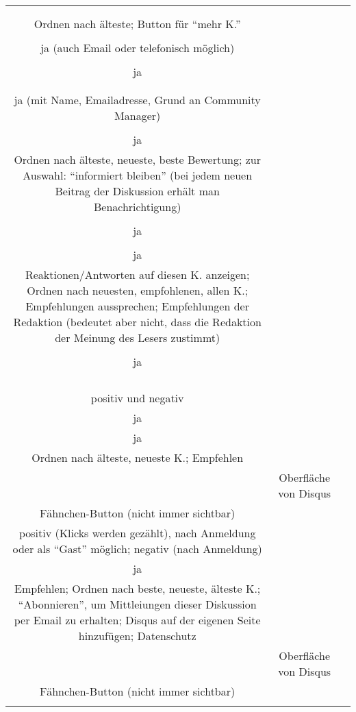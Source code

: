 \begin{landscape}
\begin{tabular}{ccc}
{		positiv\\
		\\
		Ordnen nach älteste; Button für ``mehr K.''\\
		\\
		ja (auch Email oder telefonisch möglich)\\
		\\
		ja\\
		\\
		&
		\\
		ja (mit Name, Emailadresse, Grund an Community Manager)\\
		\\
		ja\\
		Ordnen nach älteste, neueste, beste Bewertung; zur Auswahl: ``informiert bleiben'' (bei jedem neuen Beitrag der Diskussion erhält man Benachrichtigung)\\
		&
		\\
		ja\\
		\\
		ja\\
		Reaktionen/Antworten auf diesen K. anzeigen; Ordnen nach neuesten, empfohlenen, allen K.; Empfehlungen aussprechen; Empfehlungen der Redaktion (bedeutet aber nicht, dass die Redaktion der Meinung des Lesers zustimmt)\\
		&
		\\
		ja\\
		\\
		\\
		\\
		&%
		\\
		positiv und negativ\\
		ja\\
		ja\\
		Ordnen nach älteste, neueste K.; Empfehlen\\
		&%
		Oberfläche von Disqus\\
		Fähnchen-Button (nicht immer sichtbar)\\
		positiv (Klicks werden gezählt), nach Anmeldung oder als ``Gast'' möglich; negativ (nach Anmeldung)\\
		ja\\
		Empfehlen; Ordnen nach beste, neueste, älteste K.; ``Abonnieren'', um Mittleiungen dieser Diskussion per Email zu erhalten; Disqus auf der eigenen Seite hinzufügen; Datenschutz \\
		&
		Oberfläche von Disqus\\
		Fähnchen-Button (nicht immer sichtbar)\\
}
\end{tabular}
\end{landscape}
